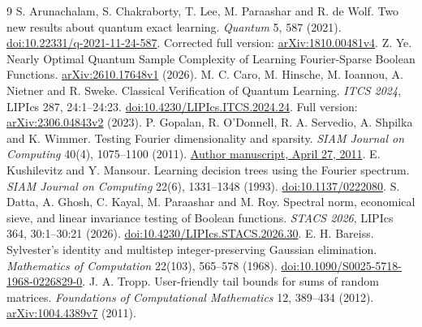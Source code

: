 \documentclass[11pt]{article}
\theoremstyle{remark}\newtheorem{remark}[theorem]{Remark}
\begin{document}
\begin{thebibliography}{9}
S. Arunachalam, S. Chakraborty, T. Lee, M. Paraashar and R. de Wolf.
Two new results about quantum exact learning.
\emph{Quantum} 5, 587 (2021).
\href{https://doi.org/10.22331/q-2021-11-24-587}{doi:10.22331/q-2021-11-24-587}.
Corrected full version: \href{https://arxiv.org/abs/1810.00481v4}{arXiv:1810.00481v4}.
Z. Ye. Nearly Optimal Quantum Sample Complexity of Learning Fourier-Sparse Boolean Functions.
\href{https://arxiv.org/abs/2610.17648v1}{arXiv:2610.17648v1} (2026).
M. C. Caro, M. Hinsche, M. Ioannou, A. Nietner and R. Sweke.
Classical Verification of Quantum Learning.
\emph{ITCS 2024}, LIPIcs 287, 24:1--24:23.
\href{https://doi.org/10.4230/LIPIcs.ITCS.2024.24}{doi:10.4230/LIPIcs.ITCS.2024.24}.
Full version: \href{https://arxiv.org/abs/2306.04843v2}{arXiv:2306.04843v2} (2023).
P. Gopalan, R. O'Donnell, R. A. Servedio, A. Shpilka and K. Wimmer.
Testing Fourier dimensionality and sparsity.
\emph{SIAM Journal on Computing} 40(4), 1075--1100 (2011).
\href{https://www.cs.columbia.edu/~rocco/Public/4-27-2011-gossw.pdf}{Author manuscript, April 27, 2011}.
E. Kushilevitz and Y. Mansour. Learning decision trees using the Fourier spectrum.
\emph{SIAM Journal on Computing} 22(6), 1331--1348 (1993).
\href{https://doi.org/10.1137/0222080}{doi:10.1137/0222080}.
S. Datta, A. Ghosh, C. Kayal, M. Paraashar and M. Roy.
Spectral norm, economical sieve, and linear invariance testing of Boolean functions.
\emph{STACS 2026}, LIPIcs 364, 30:1--30:21 (2026).
\href{https://doi.org/10.4230/LIPIcs.STACS.2026.30}{doi:10.4230/LIPIcs.STACS.2026.30}.
E. H. Bareiss. Sylvester's identity and multistep integer-preserving Gaussian elimination.
\emph{Mathematics of Computation} 22(103), 565--578 (1968).
\href{https://doi.org/10.1090/S0025-5718-1968-0226829-0}{doi:10.1090/S0025-5718-1968-0226829-0}.
J. A. Tropp. User-friendly tail bounds for sums of random matrices.
\emph{Foundations of Computational Mathematics} 12, 389--434 (2012).
\href{https://arxiv.org/abs/1004.4389v7}{arXiv:1004.4389v7} (2011).
\end{thebibliography}
\end{document}
